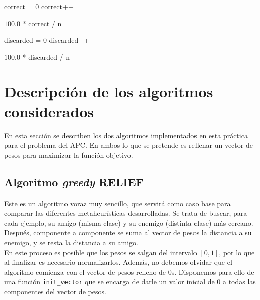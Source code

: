 \documentclass[12pt]{article}
\begin{document}
\begin{algorithm}[H]
\begin{algorithmic}

     
     \State correct = $0$
       
            \State correct++

  \Return $100.0$ * correct / n
  \EndFunction
\end{algorithmic}
\end{algorithm}

\begin{algorithm}[h]
\begin{algorithmic}

     
     \State discarded = $0$
       
            \State discarded++

  \Return $100.0$ * discarded / n
  \EndFunction
\end{algorithmic}
\end{algorithm}

\newpage
\section{Descripción de los algoritmos considerados}
En esta sección se describen los dos algoritmos implementados en esta práctica para el problema del APC. En ambos lo que se pretende es rellenar un vector de pesos para maximizar la función objetivo.

\subsection*{Algoritmo \textit{greedy} RELIEF}

Este es un algoritmo voraz muy sencillo, que servirá como caso base para comparar las diferentes metaheurísticas desarrolladas. Se trata de buscar, para cada ejemplo, su amigo (misma clase) y su enemigo (distinta clase) más cercano. Después, componente a componente se suma al vector de pesos la distancia a su enemigo, y se resta la distancia a su amigo.\\

En este proceso es posible que los pesos se salgan del intervalo $[0,1]$, por lo que al finalizar es necesario normalizarlos. Además, no debemos olvidar que el algoritmo comienza con el vector de pesos relleno de $0$s. Disponemos para ello de una función \verb|init_vector| que se encarga de darle un valor inicial de $0$ a todas las componentes del vector de pesos.\\
\end{document}
